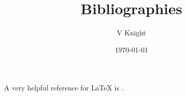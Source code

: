 \documentclass{article}
\title{Bibliographies}
\author{V Knight}
\date{\today}
\begin{document}
\maketitle

A very helpful reference for LaTeX is \cite{Gratzer2007}.



\end{document}
